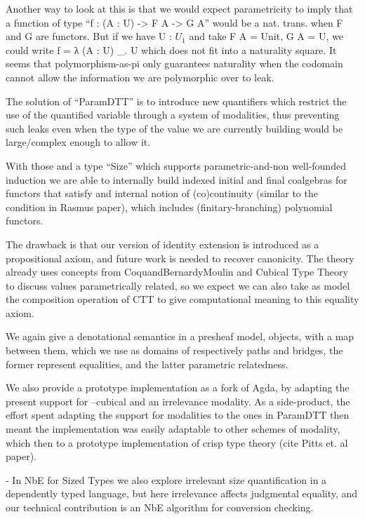 \documentclass{article}
\begin{document}
    Another way to look at this is that we would expect parametricity
    to imply that a function of type ``f : (A : U) -> F A -> G A''
    would be a nat. trans. when F and G are functors.  But if we have
    U : $U_1$ and take F A = Unit, G A = U, we could write
    f = λ (A : U) \_. U which does not fit into a naturality square.
    It seems that polymorphism-as-pi only guarantees naturality when
    the codomain cannot allow the information we are polymorphic over
    to leak.

    The solution of ``ParamDTT'' is to introduce new quantifiers which
    restrict the use of the quantified variable through a system of
    modalities, thus preventing such leaks even when the type of the
    value we are currently building would be large/complex enough to
    allow it.

    With those and a type ``Size'' which supports parametric-and-non
    well-founded induction we are able to internally build indexed
    initial and final coalgebras for functors that satisfy and
    internal notion of (co)continuity (similar to the condition in
    Rasmus paper), which includes (finitary-branching) polynomial
    functors.

    The drawback is that our version of identity extension is
    introduced as a propositional axiom, and future work is needed to
    recover canonicity. The theory already uses concepts from
    CoquandBernardyMoulin and Cubical Type Theory to discuss values
    parametrically related, so we expect we can also take as model the
    composition operation of CTT to give computational meaning to this
    equality axiom.

    We again give a denotational semantics in a presheaf model,
    objects, with a map between them, which we use as domains of
    respectively paths and bridges, the former represent equalities,
    and the latter parametric relatedness.

    We also provide a prototype implementation as a fork of Agda, by
    adapting the present support for --cubical and an irrelevance
    modality. As a side-product, the effort spent adapting the support
    for modalities to the ones in ParamDTT then meant the
    implementation was easily adaptable to other schemes of modality,
    which then to a prototype implementation of crisp type theory
    (cite Pitts et. al paper).

    
    - In NbE for Sized Types we also explore irrelevant size
    quantification in a dependently typed language, but here
    irrelevance affects judgmental equality, and our technical
    contribution is an NbE algorithm for conversion checking.
    
\end{document}
